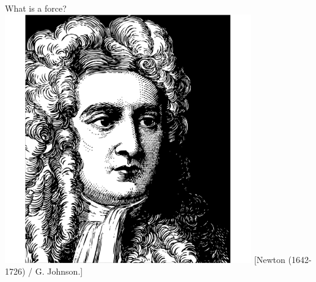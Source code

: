 \begin{frame}
\begin{ThreeCols}{What is a force?}{
  \includegraphics[width=0.8\textwidth]{Figures/Gravity/Exported/Newton_PD_GJohnson.png} \centering \tiny [Newton (1642-1726) / G. Johnson.]}
\end{ThreeCols}
\end{frame}

